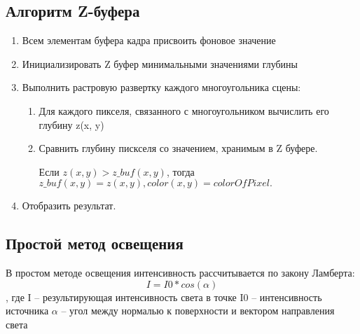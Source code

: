 \subsection{Алгоритм Z-буфера}
\begin{enumerate}
    \item Всем элементам буфера кадра присвоить фоновое значение
    \item Инициализировать Z буфер минимальными значениями глубины
    \item Выполнить растровую развертку каждого многоугольника сцены:
    \begin{enumerate}
        \item Для каждого пикселя, связанного с многоугольником вычислить его
        глубину z(x, y)
        \item Сравнить глубину пискселя со значением, хранимым в Z буфере.

            Если \(z(x, y) > z\_buf(x, y) \), тогда\newline
            \(z\_buf(x,y) = z(x,y), color(x, y) = colorOfPixel.\)
    \end{enumerate}
    \item Отобразить результат.
\end{enumerate}

\subsection{Простой метод освещения}
В простом методе освещения интенсивность рассчитывается по закону Ламберта:
\[I = I0*cos(\alpha)\], где
I – результирующая интенсивность света в точке
I0 – интенсивность источника
\(\alpha\) – угол между нормалью к поверхности и вектором направления света


